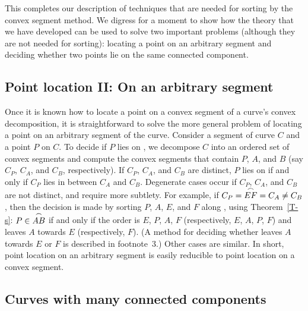 This completes our description of techniques that are needed for sorting by 
the convex segment method.
We digress for a moment to show how the theory that we have developed can 
be used
to solve two important problems (although they are not needed for sorting):
locating a point on an arbitrary segment and deciding whether two points 
lie on the
same connected component.

\subsection{Point location II: On an arbitrary segment}
\label{sec-pII}

Once it is known how to locate a point on a convex segment of a curve's
convex decomposition, it is straightforward to solve the more
general problem of locating a point on an arbitrary segment of the curve.
Consider a segment  of curve $C$ and a point $P$ on $C$.
To decide if $P$ lies on , we decompose $C$ into an ordered set 
of convex
segments and compute the convex segments 
that contain $P$, $A$, and $B$ (say $C_{P}$, $C_{A}$, and $C_{B}$, 
respectively).
If $C_{P}$, $C_{A}$, and $C_{B}$ are distinct,
$P$ lies on  if and only if $C_{P}$ lies in between $C_{A}$ and 
$C_{B}$.
Degenerate cases occur if $C_{P}$, $C_{A}$, and $C_{B}$ are not distinct,
and require more subtlety.
For example, if $C_{P} = \mbox{$\stackrel{\frown}{EF}$} = C_{A} \neq C_{B}$,
then the decision is made by sorting $P$, $A$, $E$, and $F$ along , 
using Theorem~\ref{T-s}:
$P \in \mbox{$\stackrel{\frown}{AB}$}$ if and only if the order is $E$, $P$, $A$, $F$ 
(respectively, $E$, $A$, $P$, $F$) and
 leaves $A$ towards $E$ (respectively, $F$).
(A method for deciding whether  leaves $A$ towards $E$ or $F$ 
is described in footnote~3.)
Other cases are similar.
In short, point location on an arbitrary segment is easily reducible 
to point
location on a convex segment.


\subsection{Curves with many connected components}
\label{sec-cc}

